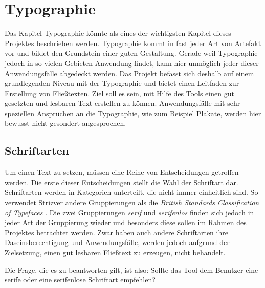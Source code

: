 
\chapter{Typographie} %

\label{Typographie} %



Das Kapitel Typographie könnte als eines der wichtigsten Kapitel dieses Projektes beschrieben werden. Typographie kommt in fast jeder Art von Artefakt vor und bildet den Grundstein einer guten Gestaltung. Gerade weil Typographie jedoch in so vielen Gebieten Anwendung findet, kann hier unmöglich jeder dieser Anwendungsfälle abgedeckt werden.
Das Projekt befasst sich deshalb auf einem grundlegenden Niveau mit der Typographie und bietet einen Leitfaden zur Erstellung von Fließtexten. Ziel soll es sein, mit Hilfe des Tools einen gut gesetzten und lesbaren Text erstellen zu können.
Anwendungsfälle mit sehr speziellen Ansprüchen an die Typographie, wie zum Beispiel Plakate, werden hier bewusst nicht gesondert angesprochen.

\section{Schriftarten}
Um einen Text zu setzen, müssen eine Reihe von Entscheidungen getroffen werden. Die erste dieser Entscheidungen stellt die Wahl der Schriftart dar.
Schriftarten werden in Kategorien unterteilt, die nicht immer einheitlich sind. So verwendet Strizver \cite{strizver2014type} andere Gruppierungen als  die \textit{British Standards Classification of Typefaces} \cite[S. 51]{baines2005type}. Die zwei Gruppierungen \textit{serif} und \textit{serifenlos} finden sich jedoch in jeder Art der Gruppierung wieder und besonders diese sollen im Rahmen des Projektes betrachtet werden.
Zwar haben auch andere Schriftarten ihre Daseinsberechtigung und Anwendungsfälle, werden jedoch aufgrund der Zielsetzung, einen gut lesbaren Fließtext zu erzeugen, nicht behandelt.

Die Frage, die es zu beantworten gilt, ist also: Sollte das Tool dem Benutzer eine serife oder eine serifenlose Schriftart empfehlen?

